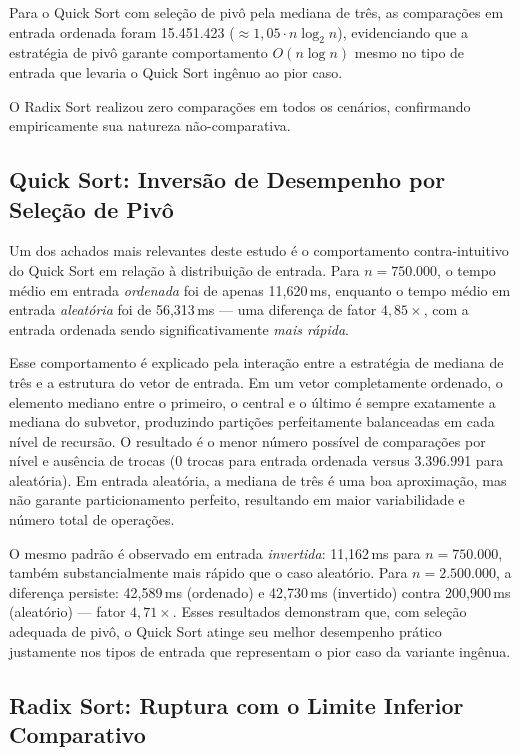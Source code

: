 \documentclass[12pt]{article}
\newcommand{\num}[1]{#1}
\begin{document}
Para o Quick Sort com seleção de pivô pela mediana de três, as
comparações em entrada ordenada foram \num{15.451.423} ($\approx
1{,}05 \cdot n \log_2 n$), evidenciando que a estratégia de pivô
garante comportamento $O(n \log n)$ mesmo no tipo de entrada que
levaria o Quick Sort ingênuo ao pior caso.

O Radix Sort realizou zero comparações em todos os cenários,
confirmando empiricamente sua natureza não-comparativa.

\subsection{Quick Sort: Inversão de Desempenho por Seleção de Pivô}

Um dos achados mais relevantes deste estudo é o comportamento
contra-intuitivo do Quick Sort em relação à distribuição de entrada.
Para $n = 750.000$, o tempo médio em entrada \textit{ordenada}
foi de apenas 11,620\,ms, enquanto o tempo médio em entrada
\textit{aleatória} foi de 56,313\,ms --- uma diferença de fator
$4{,}85\times$, com a entrada ordenada sendo significativamente
\textit{mais rápida}.

Esse comportamento é explicado pela interação entre a estratégia
de mediana de três e a estrutura do vetor de entrada. Em um vetor
completamente ordenado, o elemento mediano entre o primeiro, o
central e o último é sempre exatamente a mediana do subvetor,
produzindo partições perfeitamente balanceadas em cada nível de
recursão. O resultado é o menor número possível de comparações
por nível e ausência de trocas (0 trocas para entrada ordenada
versus \num{3.396.991} para aleatória). Em entrada aleatória,
a mediana de três é uma boa aproximação, mas não garante
particionamento perfeito, resultando em maior variabilidade e
número total de operações.

O mesmo padrão é observado em entrada \textit{invertida}: 11,162\,ms
para $n = 750.000$, também substancialmente mais rápido que o caso
aleatório. Para $n = 2.500.000$, a diferença persiste: 42,589\,ms
(ordenado) e 42,730\,ms (invertido) contra 200,900\,ms (aleatório)
--- fator $4{,}71\times$. Esses resultados demonstram que, com
seleção adequada de pivô, o Quick Sort atinge seu melhor desempenho
prático justamente nos tipos de entrada que representam o pior
caso da variante ingênua.

\subsection{Radix Sort: Ruptura com o Limite Inferior Comparativo}
\end{document}
